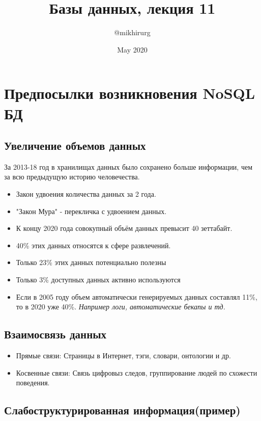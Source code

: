 \documentclass{article}
\title{Базы данных, лекция 11}
\author{@mikhirurg}
\date{May 2020}
\begin{document}
\maketitle

\section{Предпосылки возникновения NoSQL БД}

\subsection{Увеличение объемов данных}

За 2013-18 год в хранилищах данных было сохранено больше информации, чем за всю предыдущую историю человечества.
\begin{itemize}
    \item Закон удвоения количества данных за 2 года.
    \item "Закон Мура" - перекличка с удвоением данных.
    \item К концу 2020 года совокупный объём данных превысит 40 зеттабайт. 
    \item 40\% этих данных относятся к сфере развлечений.
    \item Только 23\% этих данных потенциально полезны
    \item Только 3\% доступных данных активно используются 
    \item Если в 2005 году объем автоматически генерируемых данных составлял 11\%, то в 2020 уже 40\%.
    \newline \textit{Например логи, автоматические бекапы и тд.}
\end{itemize}

\subsection{Взаимосвязь данных}

\begin{itemize}
    \item Прямые связи:
    \newline Страницы в Интернет, тэги, словари, онтологии и др.
    \item Косвенные связи:
    \newline Связь цифровыз следов, группирование людей по схожести поведения.
\end{itemize}

\subsection{Слабоструктурированная информация(пример)}
\end{document}
